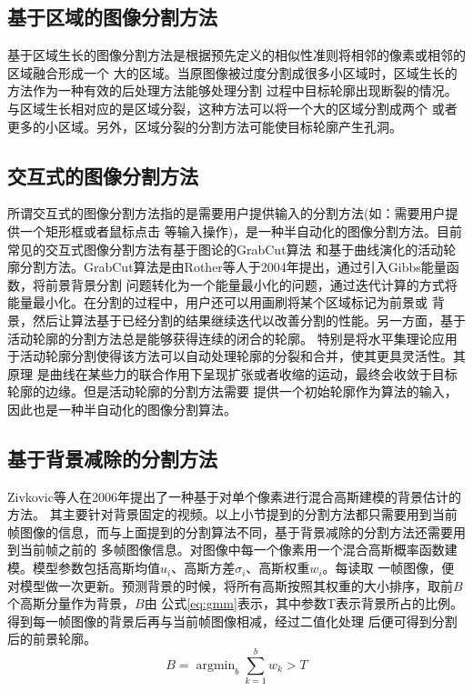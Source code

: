 \subsection{基于区域的图像分割方法}
	基于区域生长的图像分割方法是根据预先定义的相似性准则将相邻的像素或相邻的区域融合形成一个
	大的区域。当原图像被过度分割成很多小区域时，区域生长的方法作为一种有效的后处理方法能够处理分割
	过程中目标轮廓出现断裂的情况。与区域生长相对应的是区域分裂，这种方法可以将一个大的区域分割成两个
	或者更多的小区域。另外，区域分裂的分割方法可能使目标轮廓产生孔洞。
\subsection{交互式的图像分割方法}
	所谓交互式的图像分割方法指的是需要用户提供输入的分割方法(如：需要用户提供一个矩形框或者鼠标点击
	等输入操作)，是一种半自动化的图像分割方法。目前常见的交互式图像分割方法有基于图论的GrabCut算法\cite{rother2004grabcut}
	和基于曲线演化的活动轮廓分割方法\cite{kass1988snakes,tsai2001curve}。GrabCut算法是由Rother等人于2004年提出，通过引入Gibbs能量函数，将前景背景分割
	问题转化为一个能量最小化的问题，通过迭代计算的方式将能量最小化。在分割的过程中，用户还可以用画刷将某个区域标记为前景或
	背景，然后让算法基于已经分割的结果继续迭代以改善分割的性能。另一方面，基于活动轮廓的分割方法总是能够获得连续的闭合的轮廓。
	特别是将水平集理论应用于活动轮廓分割使得该方法可以自动处理轮廓的分裂和合并，使其更具灵活性。其原理
	是曲线在某些力的联合作用下呈现扩张或者收缩的运动，最终会收敛于目标轮廓的边缘。但是活动轮廓的分割方法需要
	提供一个初始轮廓作为算法的输入，因此也是一种半自动化的图像分割算法。
\subsection{基于背景减除的分割方法}
	Zivkovic等人\cite{zivkovic2006efficient}在2006年提出了一种基于对单个像素进行混合高斯建模的背景估计的方法。
	其主要针对背景固定的视频。以上小节提到的分割方法都只需要用到当前帧图像的信息，而与上面提到的分割算法不同，基于背景减除的分割方法还需要用到当前帧之前的
	多帧图像信息。对图像中每一个像素用一个混合高斯概率函数建模。模型参数包括高斯均值$u_i$、高斯方差$\sigma_i$、高斯权重$w_i$。每读取
	一帧图像，便对模型做一次更新。预测背景的时候，将所有高斯按照其权重的大小排序，取前$B$个高斯分量作为背景，$B$由
	公式\ref{eq:gmm}表示，其中参数T表示背景所占的比例。得到每一帧图像的背景后再与当前帧图像相减，经过二值化处理
	后便可得到分割后的前景轮廓。
	\begin{equation}
	B=\mathop{\arg\min}_{b} \sum_{k=1}^b w_k>T \label{eq:gmm}
	\end{equation}
